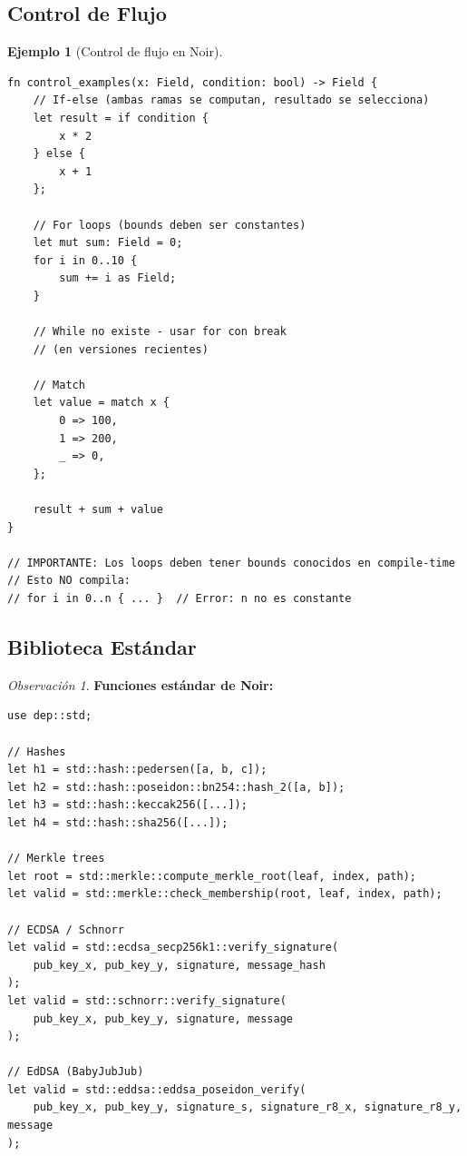 \documentclass[11pt,a4paper,twoside,openright]{book}
\theoremstyle{definition}
\newtheorem{example}{Ejemplo}[chapter]
\theoremstyle{plain}
\theoremstyle{remark}
\newtheorem{remark}{Observación}[chapter]
\begin{document}
\subsection{Control de Flujo}

\begin{example}[Control de flujo en Noir]
\begin{verbatim}
fn control_examples(x: Field, condition: bool) -> Field {
    // If-else (ambas ramas se computan, resultado se selecciona)
    let result = if condition {
        x * 2
    } else {
        x + 1
    };
    
    // For loops (bounds deben ser constantes)
    let mut sum: Field = 0;
    for i in 0..10 {
        sum += i as Field;
    }
    
    // While no existe - usar for con break
    // (en versiones recientes)
    
    // Match
    let value = match x {
        0 => 100,
        1 => 200,
        _ => 0,
    };
    
    result + sum + value
}

// IMPORTANTE: Los loops deben tener bounds conocidos en compile-time
// Esto NO compila:
// for i in 0..n { ... }  // Error: n no es constante
\end{verbatim}
\end{example}

\subsection{Biblioteca Estándar}

\begin{remark}
\textbf{Funciones estándar de Noir:}

\begin{verbatim}
use dep::std;

// Hashes
let h1 = std::hash::pedersen([a, b, c]);
let h2 = std::hash::poseidon::bn254::hash_2([a, b]);
let h3 = std::hash::keccak256([...]);
let h4 = std::hash::sha256([...]);

// Merkle trees
let root = std::merkle::compute_merkle_root(leaf, index, path);
let valid = std::merkle::check_membership(root, leaf, index, path);

// ECDSA / Schnorr
let valid = std::ecdsa_secp256k1::verify_signature(
    pub_key_x, pub_key_y, signature, message_hash
);
let valid = std::schnorr::verify_signature(
    pub_key_x, pub_key_y, signature, message
);

// EdDSA (BabyJubJub)
let valid = std::eddsa::eddsa_poseidon_verify(
    pub_key_x, pub_key_y, signature_s, signature_r8_x, signature_r8_y, message
);
\end{verbatim}
\end{remark}
\end{document}
